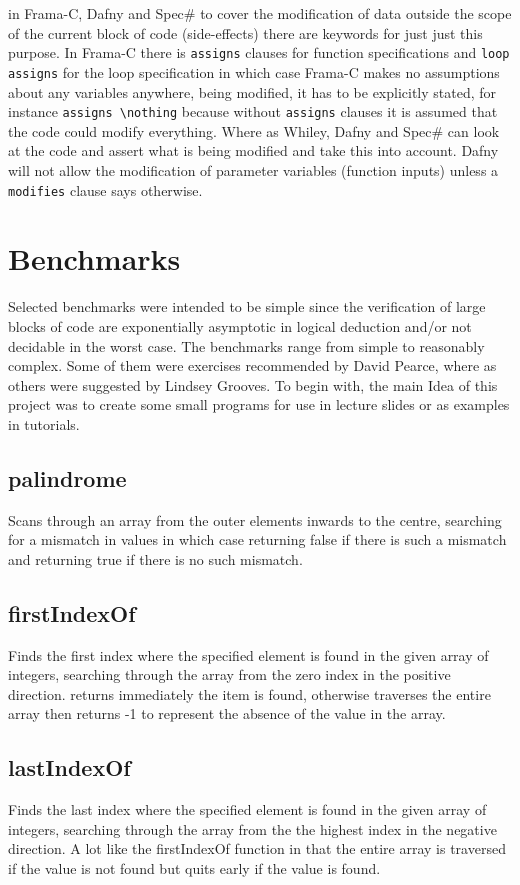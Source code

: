 \documentclass[10pt]{article} %
\begin{document}
in Frama-C, Dafny and Spec\# to cover the modification of data outside the scope of the current block of code (side-effects) there are keywords for just just this purpose. In Frama-C there is \verb/assigns/ clauses for function specifications and \verb/loop assigns/ for the loop specification in which case Frama-C makes no assumptions about any variables anywhere, being modified, it has to be explicitly stated, for instance \verb/assigns \nothing/ because without \verb/assigns/ clauses it is assumed that the code could modify everything. Where as Whiley, Dafny and Spec\# can look at the code and assert what is being modified and take this into account. Dafny will not allow the modification of parameter variables (function inputs) unless a \verb/modifies/ clause says otherwise.

\section{Benchmarks}
Selected benchmarks were intended to be simple since the verification of large blocks of code are exponentially asymptotic in logical deduction and\slash or not decidable in the worst case. The benchmarks range from simple to reasonably complex. Some of them were exercises recommended by David Pearce, where as others were suggested by Lindsey Grooves. To begin with, the main Idea of this project was to create some small programs for use in lecture slides or as examples in tutorials. 

\subsection{palindrome} 
Scans through an array from the outer elements inwards to the centre, searching for a mismatch in values in which case returning false if there is such a mismatch and returning true if there is no such mismatch.

\subsection{firstIndexOf}
Finds the first index where the specified element is found in the given array of integers, searching through the array from the zero index in the positive direction. returns immediately the item is found, otherwise traverses the entire array then returns -1 to represent the absence of the value in the array.

\subsection{lastIndexOf}
Finds the last index where the specified element is found in the given array of integers, searching through the array from the the highest index in the negative direction. A lot like the firstIndexOf function in that the entire array is traversed if the value is not found but quits early if the value is found.
\end{document}

